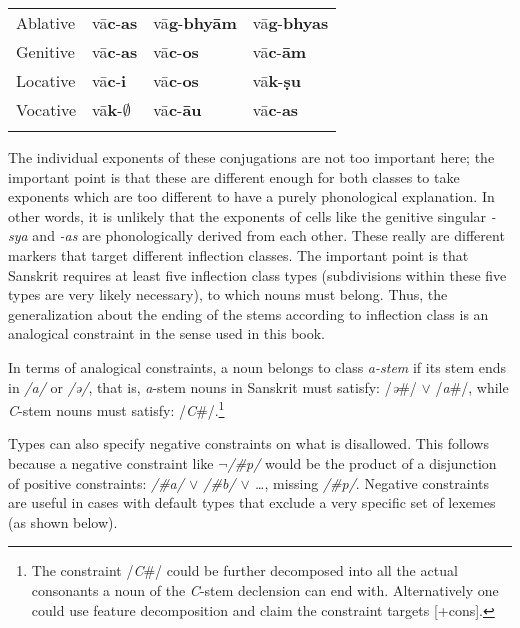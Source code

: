 \begin{table}
\begin{tabular}{llll}
      Ablative     & vā\textbf{c}-\textbf{as}          & vā\textbf{g}-\textbf{bhyām} & vā\textbf{g}-\textbf{bhyas} \\
      Genitive     & vā\textbf{c}-\textbf{as}          & vā\textbf{c}-\textbf{os}    & vā\textbf{c}-\textbf{ām}    \\
      Locative     & vā\textbf{c}-\textbf{i }          & vā\textbf{c}-\textbf{os}    & vā\textbf{k}-\textbf{ṣu}    \\
      Vocative     & vā\textbf{k}-$\emptyset$ & vā\textbf{c}-\textbf{āu}    & vā\textbf{c}-\textbf{as}    \\
      \lspbottomrule
    \end{tabular}
\end{table}

The individual exponents of these conjugations are not too important here; the important point is that these are different enough for both classes to take exponents which are too different to have a purely phonological explanation. In other words, it is unlikely that the exponents of cells like the genitive singular \textit{-sya} and \textit{-as} are phonologically derived from each other. These really are different markers that target different inflection classes. The important point is that Sanskrit requires at least five inflection class types (subdivisions within these five types are very likely necessary), to which nouns must belong. Thus, the generalization about the ending of the stems according to inflection class is an analogical constraint in the sense used in this book.

In terms of analogical constraints, a noun belongs to class \textit{a-stem} if its stem ends in \textit{/a/} or \textit{/ə/}, that is, \textit{a}-stem nouns in Sanskrit must satisfy: /\textit{ə}\#/ $\lor$ /\textit{a}\#/, while \textit{C}-stem nouns must satisfy: /\textit{C}\#/.\footnote{The constraint /\textit{C}\#/ could be further decomposed into all the actual consonants a noun of the \textit{C}-stem declension can end with. Alternatively one could use feature decomposition and claim the constraint targets [+cons].}

Types can also specify negative constraints on what is disallowed. This follows because a negative constraint like \textit{$\lnot$/\#p/} would be the product of a disjunction of positive constraints: \textit{/\#a/ $\lor$ /\#b/ $\lor$ \dots}, missing \textit{/\#p/}. Negative constraints are useful in cases with default types that exclude a very specific set of lexemes (as shown below). 

